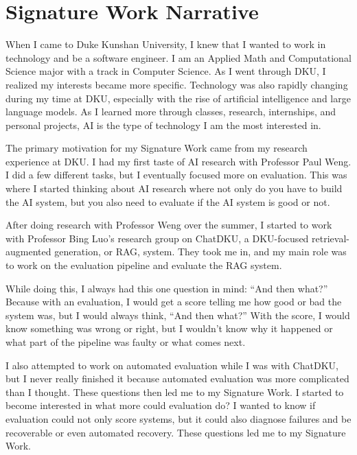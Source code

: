 \documentclass[12pt, a4paper, oneside]{report}
\begin{document}

\chapter*{Signature Work Narrative}
\label{narrative}

When I came to Duke Kunshan University, I knew that I wanted to work in technology and be a software engineer. I am an Applied Math and Computational Science major with a track in Computer Science. As I went through DKU, I realized my interests became more specific. Technology was also rapidly changing during my time at DKU, especially with the rise of artificial intelligence and large language models. As I learned more through classes, research, internships, and personal projects, AI is the type of technology I am the most interested in.

The primary motivation for my Signature Work came from my research experience at DKU. I had my first taste of AI research with Professor Paul Weng. I did a few different tasks, but I eventually focused more on evaluation. This was where I started thinking about AI research where not only do you have to build the AI system, but you also need to evaluate if the AI system is good or not.

After doing research with Professor Weng over the summer, I started to work with Professor Bing Luo's research group on ChatDKU, a DKU-focused retrieval-augmented generation, or RAG, system. They took me in, and my main role was to work on the evaluation pipeline and evaluate the RAG system.

While doing this, I always had this one question in mind: ``And then what?'' Because with an evaluation, I would get a score telling me how good or bad the system was, but I would always think, ``And then what?'' With the score, I would know something was wrong or right, but I wouldn't know why it happened or what part of the pipeline was faulty or what comes next.

I also attempted to work on automated evaluation while I was with ChatDKU, but I never really finished it because automated evaluation was more complicated than I thought. These questions then led me to my Signature Work. I started to become interested in what more could evaluation do? I wanted to know if evaluation could not only score systems, but it could also diagnose failures and be recoverable or even automated recovery. These questions led me to my Signature Work.
\end{document}
